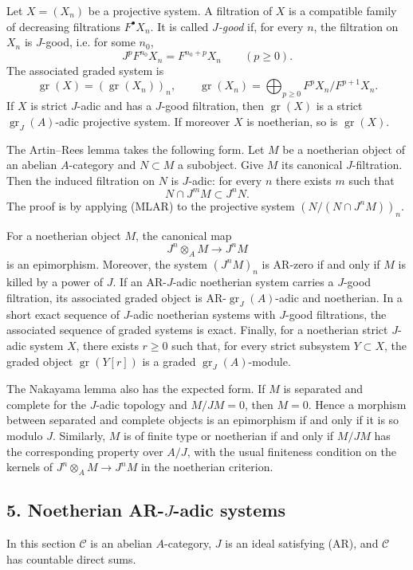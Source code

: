 \documentclass[12pt]{article}
\newcommand{\cC}{\mathcal C}
\newcommand{\gr}{\operatorname{gr}}
\begin{document}
Let $X=(X_n)$ be a projective system. A filtration of $X$ is a compatible family of
decreasing filtrations $F^\bullet X_n$. It is called \emph{$J$-good} if, for every
$n$, the filtration on $X_n$ is $J$-good, i.e. for some $n_0$,
\[
       J^pF^{n_0}X_n=F^{n_0+p}X_n\qquad(p\ge0).
\]
The associated graded system is
\[
       \gr(X)=(\gr(X_n))_n,
       \qquad \gr(X_n)=\bigoplus_{p\ge0}F^pX_n/F^{p+1}X_n.
\]
If $X$ is strict $J$-adic and has a $J$-good filtration, then $\gr(X)$ is a strict
$\gr_J(A)$-adic projective system. If moreover $X$ is noetherian, so is
$\gr(X)$.

The Artin--Rees lemma takes the following form. Let $M$ be a noetherian object of
an abelian $A$-category and $N\subset M$ a subobject. Give $M$ its canonical
$J$-filtration. Then the induced filtration on $N$ is $J$-adic: for every $n$ there
exists $m$ such that
\[
        N\cap J^mM\subset J^nN.
\]
The proof is by applying (MLAR) to the projective system
$(N/(N\cap J^nM))_n$.

For a noetherian object $M$, the canonical map
\[
      J^n\otimes_A M\longrightarrow J^nM
\]
is an epimorphism. Moreover, the system $(J^nM)_n$ is AR-zero if and only if $M$
is killed by a power of $J$. If an AR-$J$-adic noetherian system carries a $J$-good
filtration, its associated graded object is AR-$\gr_J(A)$-adic and noetherian. In a
short exact sequence of $J$-adic noetherian systems with $J$-good filtrations, the
associated sequence of graded systems is exact. Finally, for a noetherian strict
$J$-adic system $X$, there exists $r\ge0$ such that, for every strict subsystem
$Y\subset X$, the graded object $\gr(Y[r])$ is a graded $\gr_J(A)$-module.

The Nakayama lemma also has the expected form. If $M$ is separated and complete for
the $J$-adic topology and $M/JM=0$, then $M=0$. Hence a morphism between separated
and complete objects is an epimorphism if and only if it is so modulo $J$. Similarly,
$M$ is of finite type or noetherian if and only if $M/JM$ has the corresponding
property over $A/J$, with the usual finiteness condition on the kernels of
$J^n\otimes_A M\to J^nM$ in the noetherian criterion.

\subsection*{5. Noetherian AR-$J$-adic systems}

In this section $\cC$ is an abelian $A$-category, $J$ is an ideal satisfying (AR),
and $\cC$ has countable direct sums.
\end{document}
